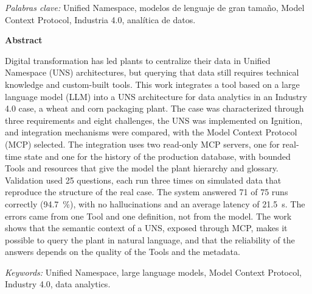 \documentclass[stu, 12pt, letterpaper, donotrepeattitle, floatsintext]{apa7}
\begin{document}
\noindent\textit{Palabras clave:} Unified Namespace, modelos de lenguaje de gran tamaño, Model Context Protocol, Industria 4.0, analítica de datos.
\newpage
\begin{center}
    {\large \textbf{Abstract}}
\end{center}
\justify
Digital transformation has led plants to centralize their data in Unified Namespace (UNS) architectures, but querying that data still requires technical knowledge and custom-built tools. This work integrates a tool based on a large language model (LLM) into a UNS architecture for data analytics in an Industry 4.0 case, a wheat and corn packaging plant. The case was characterized through three requirements and eight challenges, the UNS was implemented on Ignition, and integration mechanisms were compared, with the Model Context Protocol (MCP) selected. The integration uses two read-only MCP servers, one for real-time state and one for the history of the production database, with bounded Tools and resources that give the model the plant hierarchy and glossary. Validation used 25 questions, each run three times on simulated data that reproduce the structure of the real case. The system answered 71 of 75 runs correctly (94.7~\%), with no hallucinations and an average latency of 21.5~s. The errors came from one Tool and one definition, not from the model. The work shows that the semantic context of a UNS, exposed through MCP, makes it possible to query the plant in natural language, and that the reliability of the answers depends on the quality of the Tools and the metadata.

\noindent\textit{Keywords:} Unified Namespace, large language models, Model Context Protocol, Industry 4.0, data analytics.

\newpage










\clearpage{}


\cleardoublepage
\end{document}
